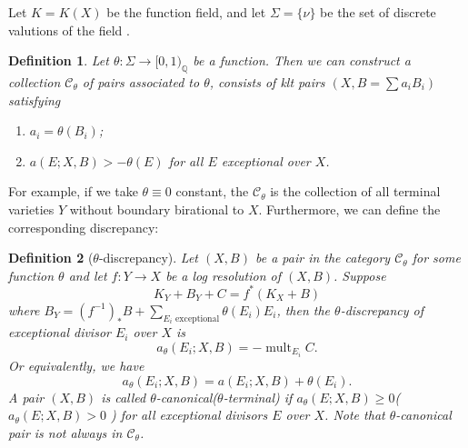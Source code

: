 \documentclass{article}
\newtheorem{defn}{Definition}[subsection]
\begin{document}
Let $ K=K(X) $ be the function field, and let $ \Sigma=\{\nu\} $ be the set of discrete valutions of the field . 
\begin{defn}\label{thetacategory}
  \cite[Definition 3.5]{brunoLogSarkisovProgram1995}
  Let  $\theta:\Sigma\to [0,1)_\mathbb{Q}$ be a function. Then we can construct a collection $ \mathcal{C}_\theta $ of pairs  associated to $ \theta $, consists of klt pairs $ (X,B=\sum a_iB_i) $ satisfying
  \begin{enumerate}
    \item $ a_i=\theta(B_i) $;
    \item $ a(E;X,B)>-\theta(E) $ for all $ E $ exceptional over $ X $.
  \end{enumerate} 
\end{defn}
For example, if we take $\theta \equiv 0$ constant, the $\mathcal{C}_{\theta}$ is the collection of all terminal varieties $Y$ without boundary birational to $X$. Furthermore, we can define the corresponding discrepancy:
\begin{defn}[$\theta$-discrepancy]
  Let $(X,B)$ be a pair in the category $\mathcal{C}_{\theta}$ for some function $\theta$ and let  $f:Y\to X$ be a log resolution of $(X,B)$. Suppose
  \[
  K_{Y}+B_{Y}+C=f^*(K_{X}+B)
  \]
  where $B_{Y}=(f^{-1})_*B+ \sum_{E_{i}\text{ exceptional}} \theta(E_{i})E_{i}$, then the $\theta$-discrepancy  of exceptional divisor $E_{i}$ over $X$ is 
  \[
    a_{\theta}(E_{i};X,B)=-\operatorname{mult}_{E_{i}}C.
  \]
 Or equivalently, we have 
 \[
    a_{\theta}(E_{i};X,B)=a(E_{i};X,B)+\theta(E_{i}).
 \]
A pair $(X,B)$ is called $\theta$-canonical($\theta$-terminal) if $a_{\theta}(E;X,B)\geqslant 0$($a_{\theta}(E;X,B)> 0$ ) for all exceptional  divisors $E$ over $X$.  Note that $\theta$-canonical pair is not always in $\mathcal{C}_{\theta}$.
\end{defn}


\end{document}
